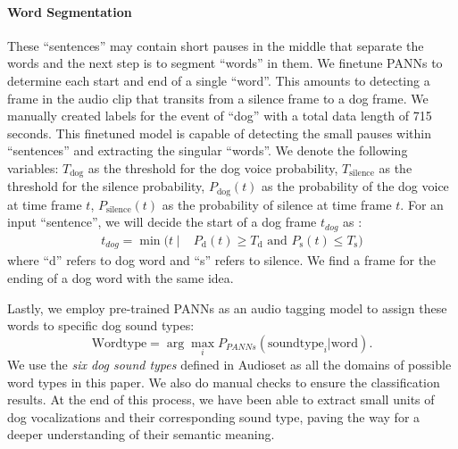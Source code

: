 \paragraph{Word Segmentation}
These ``sentences'' may contain short pauses in the middle that separate the 
words and the next step is to segment ``words'' in them. 
We finetune PANNs to determine each start and end of a single ``word''. 
This amounts to detecting a frame in the audio clip that transits from 
a silence frame to a dog frame.
We manually created labels for the event of ``dog'' with 
a total data length of 715 seconds. This finetuned model is capable of 
detecting the small pauses within ``sentences'' and extracting the 
singular ``words''. We denote the following variables:
$T_{\text{dog}}$ as the threshold for the dog voice probability, 
$T_{\text{silence}}$ as the threshold for the silence probability, 
$P_{\text{dog}}(t)$ as the probability of the dog voice at time frame $t$, 
$P_{\text{silence}}(t)$ as the probability of silence at time frame $t$. 
For an input ``sentence'',  we will decide the start of a dog frame 
$t_{dog}$ as :
\begin{align*}
t_{dog} = \min (t\mid & P_{\text{d}}(t)\ge T_{\text{d}} \text{ and } P_{\text{s}}(t) \le T_{\text{s}} )
\end{align*}
where ``d'' refers to dog word and ``s'' refers to silence. 
We find a frame for the ending of a dog word with the same idea. 


Lastly, we employ pre-trained PANNs as an audio tagging model to 
assign these words to specific dog sound types:
\begin{equation}
\text{Wordtype} = \arg\max_{i} P_{PANNs}(\text{soundtype}_i | \text{word}).
\end{equation}
We use the \textit{six dog sound types} defined in Audioset as all 
the domains of possible word types in this paper. 
We also do manual checks to ensure the classification results. 
At the end of this process, we have been able to extract small units of 
dog vocalizations and their corresponding sound type, 
paving the way for a deeper understanding of their semantic meaning. 

